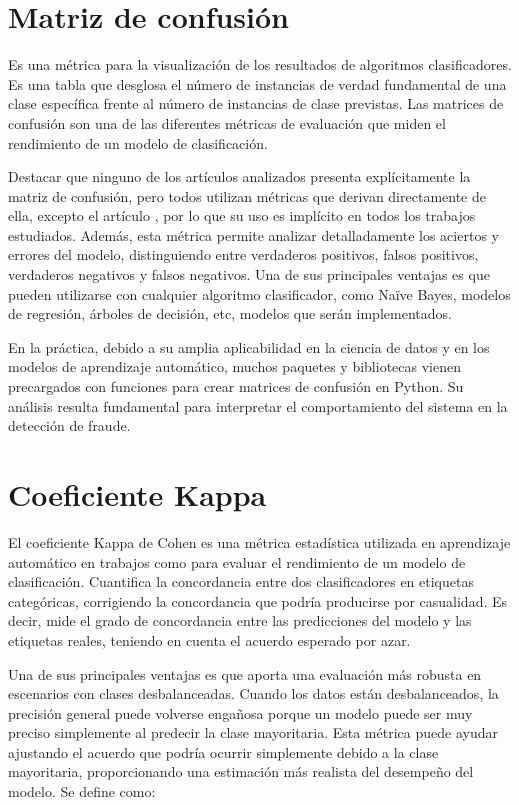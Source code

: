 \documentclass[12pt,a4paper]{report}
\begin{document}
\section{Matriz de confusión}

Es una métrica para la visualización de los resultados de algoritmos clasificadores. Es una tabla que desglosa el número de instancias de verdad fundamental de una clase específica frente al número de instancias de clase previstas. Las matrices de confusión son una de las diferentes métricas de evaluación que miden el rendimiento de un modelo de clasificación.

Destacar que ninguno de los artículos analizados presenta explícitamente la matriz de confusión, pero todos utilizan métricas que derivan directamente de ella, excepto el artículo \cite{articulo4}, por lo que su uso es implícito en todos los trabajos estudiados. Además, esta métrica permite analizar detalladamente los aciertos y errores del modelo, distinguiendo entre verdaderos positivos, falsos positivos, verdaderos negativos y falsos negativos. Una de sus principales ventajas es que pueden utilizarse con cualquier algoritmo clasificador, como Naïve Bayes, modelos de regresión, árboles de decisión, etc, modelos que serán implementados. 

En la práctica, debido a su amplia aplicabilidad en la ciencia de datos y en los modelos de aprendizaje automático, muchos paquetes y bibliotecas vienen precargados con funciones para crear matrices de confusión en Python. Su análisis resulta fundamental para interpretar el comportamiento del sistema en la detección de fraude.


\section{Coeficiente Kappa}

El coeficiente Kappa de Cohen es una métrica estadística utilizada en aprendizaje automático en trabajos como \cite{articulo1} para evaluar el rendimiento de un modelo de clasificación. Cuantifica la concordancia entre dos clasificadores en etiquetas categóricas, corrigiendo la concordancia que podría producirse por casualidad. Es decir, mide el grado de concordancia entre las predicciones del modelo y las etiquetas reales, teniendo en cuenta el acuerdo esperado por azar. 

Una de sus principales ventajas es que aporta una evaluación más robusta en escenarios con clases desbalanceadas. Cuando los datos están desbalanceados, la precisión general puede volverse engañosa porque un modelo puede ser muy preciso simplemente al predecir la clase mayoritaria. Esta métrica puede ayudar ajustando el acuerdo que podría ocurrir simplemente debido a la clase mayoritaria, proporcionando una estimación más realista del desempeño del modelo. Se define como:
\end{document}
